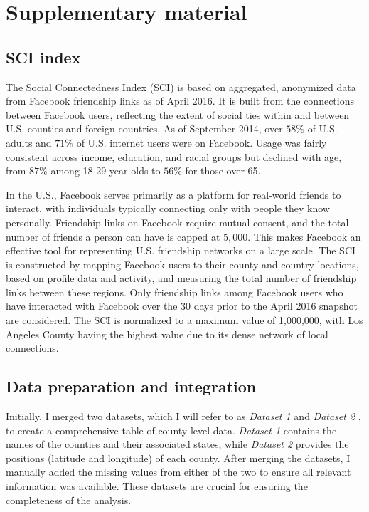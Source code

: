 \chapter{Supplementary material}

\section{SCI index}
The Social Connectedness Index (SCI) is based on aggregated, anonymized data from Facebook friendship links as of April 2016. It is built from the connections between Facebook users, reflecting the extent of social ties within and between U.S. counties and foreign countries. As of September 2014, over $58\%$ of U.S. adults and $71\%$ of U.S. internet users were on Facebook. Usage was fairly consistent across income, education, and racial groups but declined with age, from $87\%$ among 18-29 year-olds to $56\%$ for those over 65.

In the U.S., Facebook serves primarily as a platform for real-world friends to interact, with individuals typically connecting only with people they know personally. Friendship links on Facebook require mutual consent, and the total number of friends a person can have is capped at $5,000$. This makes Facebook an effective tool for representing U.S. friendship networks on a large scale. The SCI is constructed by mapping Facebook users to their county and country locations, based on profile data and activity, and measuring the total number of friendship links between these regions. Only friendship links among Facebook users who have interacted with Facebook over the 30 days prior to the April 2016 snapshot are considered. The SCI is normalized to a maximum value of 1,000,000, with Los Angeles County having the highest value due to its dense network of local connections.

\section{Data preparation and integration}
 Initially, I merged two datasets, which I will refer to as \textit{Dataset 1} \cite{ChuckConnellFIPS2County} and \textit{Dataset 2} \cite{RussellSamoraGist}, to create a comprehensive table of county-level data. \textit{Dataset 1} contains the names of the counties and their associated states, while \textit{Dataset 2} provides the positions (latitude and longitude) of each county. After merging the datasets, I manually added the missing values from either of the two to ensure all relevant information was available. These datasets are crucial for ensuring the completeness of the analysis.


